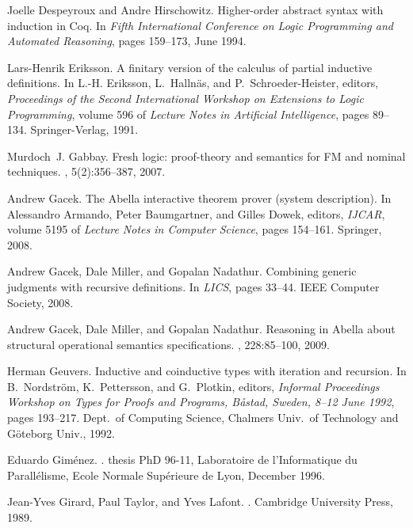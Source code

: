 \documentclass[preprint]{elsarticle}
\begin{document}
\begin{thebibliography}{10}
Joelle Despeyroux and Andre Hirschowitz.
\newblock Higher-order abstract syntax with induction in {Coq}.
\newblock In {\em Fifth International Conference on Logic Programming and
  Automated Reasoning}, pages 159--173, June 1994.

Lars-Henrik Eriksson.
\newblock A finitary version of the calculus of partial inductive definitions.
\newblock In L.-H. Eriksson, L.~Halln{\"{a}}s, and P.~Schroeder-Heister,
  editors, {\em Proceedings of the Second International Workshop on Extensions
  to Logic Programming}, volume 596 of {\em Lecture Notes in Artificial
  Intelligence}, pages 89--134. Springer-Verlag, 1991.

Murdoch~J. Gabbay.
\newblock Fresh logic: proof-theory and semantics for {FM} and nominal
  techniques.
, 5(2):356--387, 2007.

Andrew Gacek.
\newblock The {Abella} interactive theorem prover (system description).
\newblock In Alessandro Armando, Peter Baumgartner, and Gilles Dowek, editors,
  {\em IJCAR}, volume 5195 of {\em Lecture Notes in Computer Science}, pages
  154--161. Springer, 2008.

Andrew Gacek, Dale Miller, and Gopalan Nadathur.
\newblock Combining generic judgments with recursive definitions.
\newblock In {\em LICS}, pages 33--44. IEEE Computer Society, 2008.

Andrew Gacek, Dale Miller, and Gopalan Nadathur.
\newblock Reasoning in {Abella} about structural operational semantics
  specifications.
, 228:85--100, 2009.

Herman Geuvers.
\newblock Inductive and coinductive types with iteration and recursion.
\newblock In B.~Nordstr{\"o}m, K.~Pettersson, and G.~Plotkin, editors, {\em
  Informal Proceedings Workshop on Types for Proofs and Programs, B{\aa}stad,
  Sweden, 8--12 June 1992}, pages 193--217. Dept.\ of Computing Science,
  Chalmers Univ.\ of Technology and G{\"o}teborg Univ., 1992.

Eduardo Gim{\'e}nez.
.
 thesis {PhD} 96-11, Laboratoire de l'Informatique du
  Parall{\'e}lisme, Ecole Normale Sup{\'e}rieure de Lyon, December 1996.

Jean-Yves Girard, Paul Taylor, and Yves Lafont.
.
\newblock Cambridge University Press, 1989.


\end{thebibliography}
\end{document}
